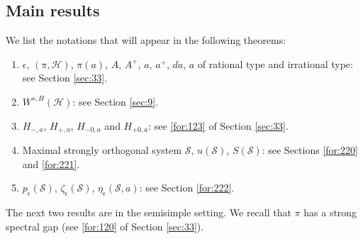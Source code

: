 \documentclass[11 pt]{amsart}
\theoremstyle{definition}
\numberwithin{equation}{section}
\begin{document}
\subsection{Main results} We list  the notations that will appear in the following theorems:
\begin{enumerate}


  \item $\epsilon$, $(\pi, \mathcal{H})$, $\pi(a)$, $A$, $A^+$, $a$, $a^+$, $da$, $a$ of rational type and irrational type:  see Section \ref{sec:33}.

\item $W^{s,H}(\mathcal{H})$: see Section \ref{sec:9}.

  \item $H_{-,a}$, $H_{+,a}$, $H_{-0,a}$ and $H_{+0,a}$: see \eqref{for:123} of Section \ref{sec:33}.
  \item Maximal strongly orthogonal system $\mathcal{S}$,  $u(\mathcal{S})$, $S(\mathcal{S})$: see Sections \ref{for:220} and \ref{for:221}.
  \item $p_{\epsilon}(\mathcal{S})$, $\zeta_{\epsilon}(\mathcal{S})$, $\eta_\epsilon(\mathcal{S}, a)$: see Section \ref{for:222}.


\end{enumerate}





The next two results are in the semisimple setting. We recall that $\pi$ has a strong spectral gap (see \eqref{for:120} of Section \ref{sec:33}).
\end{document}
